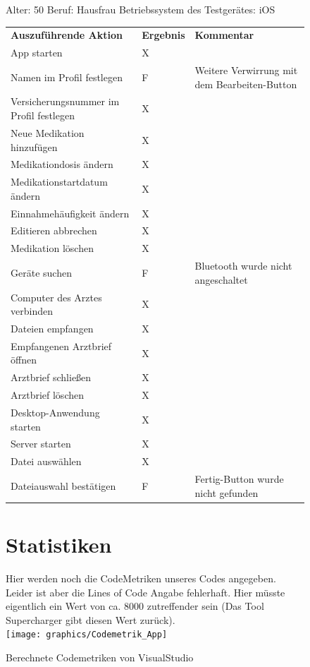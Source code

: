\documentclass[a4paper]{scrreprt}
\begin{document}
 \begin{figure}
 
   Alter: 50 \newline
Beruf: Hausfrau \newline
Betriebssystem des Testgerätes: iOS \newline \newline
 \begin{tabular}{ |l|l| p{6cm} }
  \textbf{Auszuführende Aktion} & \textbf{Ergebnis} & \textbf{Kommentar} \\
App starten & X & \\
Namen im Profil festlegen & F & Weitere Verwirrung mit dem Bearbeiten-Button \\
Versicherungsnummer im Profil festlegen & X & \\
Neue Medikation hinzufügen & X & \\
Medikationdosis ändern & X & \\
Medikationstartdatum ändern & X & \\
Einnahmehäufigkeit ändern & X & \\
Editieren abbrechen & X & \\
Medikation löschen & X & \\
Geräte suchen & F & Bluetooth wurde nicht angeschaltet \\
Computer des Arztes verbinden & X & \\
Dateien empfangen & X & \\
Empfangenen Arztbrief öffnen & X & \\
Arztbrief schließen & X & \\
Arztbrief löschen & X & \\
Desktop-Anwendung starten & X & \\
Server starten & X & \\
Datei auswählen & X & \\
Dateiauswahl bestätigen & F & Fertig-Button wurde nicht gefunden \\
 \end{tabular}
\end{figure}
\begin{figure}

\section{Statistiken}
Hier werden noch die CodeMetriken unseres Codes angegeben. Leider ist aber die Lines of Code Angabe fehlerhaft. Hier müsste eigentlich ein Wert von ca. 8000 zutreffender sein (Das Tool Supercharger gibt diesen Wert zurück). \\
\texttt{[image: graphics/Codemetrik\_App]}
\caption{Berechnete Codemetriken von VisualStudio}
\end{figure}

\printnoidxglossaries

\listoffigures
 
\end{document}
